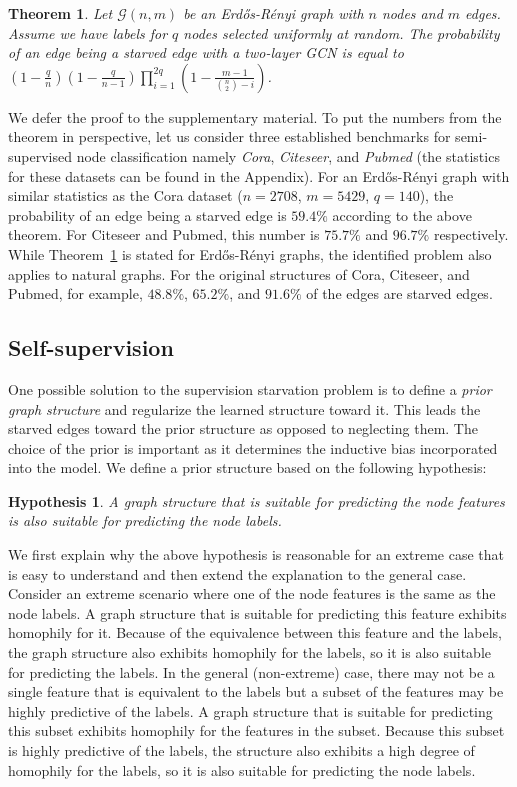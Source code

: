 \documentclass{article}
\newcommand{\graph}[1]{\ensuremath{\mathcal{#1}}}
\newtheorem{theorem}{Theorem}
\newtheorem{hypothesis}{Hypothesis}
\begin{document}
\begin{theorem} \label{thrm}
Let $\graph{G}(n, m)$ be an Erd\H{o}s-R\'enyi graph with $n$ nodes and $m$ edges. Assume we have labels for $q$ nodes selected uniformly at random. 
The probability of an edge being a starved edge with a two-layer GCN is equal to $(1 - \frac{q}{n})(1 - \frac{q}{n-1})\prod_{i=1}^{2q}(1 - \frac{m-1}{{n \choose 2}-i})$.
\end{theorem}

We defer the proof to the supplementary material. 
To put the numbers from the theorem in perspective, let us consider three established benchmarks for semi-supervised node classification namely \emph{Cora}, \emph{Citeseer}, and \emph{Pubmed} (the statistics for these datasets can be found in the Appendix). For an Erd\H{o}s-R\'enyi graph with similar statistics as the Cora dataset ($n=2708$, $m=5429$, $q=140$),
the probability of an edge being a starved edge is $59.4\%$ according to the above theorem. For Citeseer and Pubmed, this number is $75.7\%$ and $96.7\%$ respectively.
While Theorem~\ref{thrm} is stated for Erd\H{o}s-R\'enyi graphs, the identified problem also applies to natural graphs. For the original structures of Cora, Citeseer, and Pubmed, for example, $48.8\%$, $65.2\%$, and $91.6\%$ of the edges are starved edges.

\subsection{Self-supervision} \label{sec:self-supervision}
One possible solution to the supervision starvation problem is to define a \emph{prior graph structure} and regularize the learned structure toward it. 
This leads the starved edges toward the prior structure as opposed to neglecting them.
The choice of the prior is important as it determines the inductive bias incorporated into the model.
We define a prior structure based on the following hypothesis:
\begin{hypothesis}
A graph structure that is suitable for predicting the node features is also suitable for predicting the node labels.
\end{hypothesis}
We first explain why the above hypothesis is reasonable for an extreme case that is easy to understand and then extend the explanation to the general case.
Consider an extreme scenario where one of the node features is the same as the node labels. A graph structure that is suitable for predicting this feature exhibits homophily for it. Because of the equivalence between this feature and the labels, the graph structure also exhibits homophily for the labels, so it is also suitable for predicting the labels. In the general (non-extreme) case, there may not be a single feature that is equivalent to the labels but a subset of the features may be highly predictive of the labels. A graph structure that is suitable for predicting this subset exhibits homophily for the features in the subset. Because this subset is highly predictive of the labels, the structure also exhibits a high degree of homophily for the labels, so it is also suitable for predicting the node labels.
\end{document}
